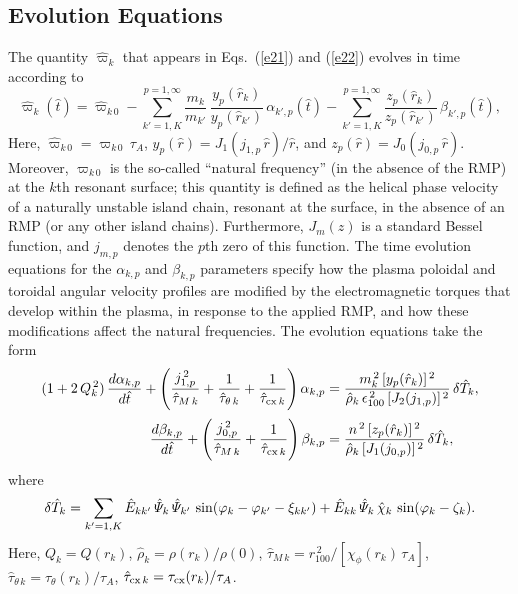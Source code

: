 \documentclass[notitlepage,12pt]{article}
\begin{document}
\subsection{Evolution Equations}
The quantity $\hat{\varpi}_k$ that appears in Eqs.~(\ref{e21}) and (\ref{e22}) evolves in time according to
\begin{equation}\label{e19a}
\hat{\varpi}_k(\hat{t})= \hat{\varpi}_{k\,0}-\sum_{k'=1,K}^{p=1,\infty} \frac{m_k}{m_{k'}}\,\frac{y_p(\hat{r}_k)}{y_p(\hat{r}_{k'})}\,\alpha_{k',p}(\hat{t})-\sum_{k'=1,K}^{p=1,\infty}\frac{z_p(\hat{r}_k)}{z_p(\hat{r}_{k'})}\,\beta_{k',p}(\hat{t}),
\end{equation}
Here, $\hat{\varpi}_{k\,0}= \varpi_{k\,0}\,\tau_A$, $y_p(\hat{r})=J_1(j_{1,p}\,\hat{r})/\hat{r}$, and $z_p(\hat{r})=J_0(j_{0,p}\,\hat{r})$. Moreover, $\varpi_{k\,0}$
is the so-called ``natural frequency''  (in the absence of the RMP) at the $k$th resonant surface; this quantity is defined as the helical phase velocity of a naturally unstable island chain, resonant at the surface, in the
absence of an RMP (or any other island chains). Furthermore, $J_m(z)$ is a standard Bessel function, and $j_{m,p}$ denotes the $p$th zero of this function. 
The time evolution equations for the $\alpha_{k,p}$ and $\beta_{k,p}$ parameters specify how the
plasma poloidal and toroidal angular velocity profiles are modified by the electromagnetic torques that develop within the plasma, in response to the applied
RMP, and how these modifications affect the natural frequencies. The evolution equations take the form
\begin{align}
(1+2\,Q_k^{\,2})\,\frac{d\alpha_{k,p}}{d\hat{t}}+ \left(\frac{j_{1,p}^{\,2}}{\hat{\tau}_{M\,k}}+\frac{1}{\hat{\tau}_{\theta\,k}}+\frac{1}{\hat{\tau}_{{\rm cx}\,k}}\right)\alpha_{k,p}&=
\frac{m_k^{\,2}\,[y_p(\hat{r}_k)]^{\,2}}{\hat{\rho}_k\,\epsilon_{100}^{\,2}\,[J_2(j_{1,p})]^{\,2}}\,\delta\hat{T}_k,\\[0.5ex]
\frac{d\beta_{k,p}}{d\hat{t}}+ \left(\frac{j_{0,p}^{\,2}}{\hat{\tau}_{M\,k}}+\frac{1}{\hat{\tau}_{{\rm cx}\,k}}\right)\beta_{k,p}&=
\frac{n^{\,2}\,[z_p(\hat{r}_k)]^{\,2}}{\hat{\rho}_k\,[J_1(j_{0,p})]^{\,2}}\,\delta\hat{T}_k,
\end{align}
where
\begin{equation}\label{e24a}
\delta \hat{T}_k=\sum_{k'=1,K}\hat{E}_{kk'}\,\hat{\mit\Psi}_k\,\hat{\mit\Psi}_{k'}\,\sin(\varphi_k-\varphi_{k'}-\xi_{kk'})+\hat{E}_{kk}\,\hat{\mit\Psi}_k\,\hat{\chi}_k\,\sin(\varphi_k-\zeta_k).
\end{equation}
Here, $Q_k = Q(r_k)$, $\hat{\rho}_k=\rho(r_k)/\rho(0)$, $\hat{\tau}_{M\,k}= r_{100}^{\,2}/[\chi_\phi(r_k)\,\tau_A]$,  $\hat{\tau}_{\theta\,k}=\tau_\theta(r_k)/\tau_A$, $\hat{\tau}_{{\rm cx}\,k} =\tau_{{\rm cx}}(r_k)/\tau_A$. 
\end{document}

